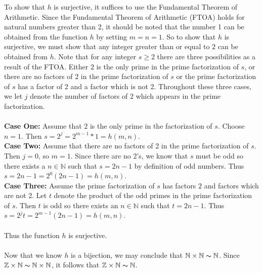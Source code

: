 \documentclass[12pt]{article}
\begin{document}
\noindent To show that $h$ is surjective, it suffices to use the Fundamental Theorem of Arithmetic. Since the Fundamental Theorem of Arithmetic (FTOA) holds for natural numbers greater than 2, it should be noted that the number 1 can be obtained from the function $h$ by setting $m=n=1$. So to show that $h$ is surjective, we must show that any integer greater than or equal to $2$ can be obtained from $h$. Note that for any integer $s \geq 2$ there are three possibilities as a result of the FTOA. Either $2$ is the only prime in the prime factorization of $s$, or there are no factors of $2$ in the prime factorization of $s$ or the prime factorization of $s$ has a factor of 2 and a factor which is not 2. Throughout these three cases, we let $j$ denote the number of factors of $2$ which appears in the prime factorization. \\ \\
\textbf{Case One:} Assume that $2$ is the only prime in the factorization of $s$. Choose $n=1$. Then $s=2^{j}=2^{m-1}*1=h(m,n)$. \\
\textbf{Case Two:} Assume that there are no factors of 2 in the prime factorization of $s$. Then $j=0$, so $m=1$. Since there are no 2's, we know that $s$ must be odd so there exists a $n \in \mathbb{N}$ such that $s=2n-1$ by definition of odd numbers. Thus $s=2n-1=2^{0}(2n-1)=h(m,n)$. \\
\textbf{Case Three:} Assume the prime factorization of $s$ has  factors $2$ and factors which are not 2. Let $t$ denote the product of the odd primes in the prime factorization of $s$. Then $t$ is odd so there exists an $n \in \mathbb{N}$ such that $t=2n-1$. Thus $s=2^{j}t=2^{m-1}(2n-1)=h(m,n)$. \\ \\
Thus the function $h$ is surjective. \\ \\

\noindent Now that we know $h$ is a bijection, we may conclude that $\mathbb{N} \times \mathbb{N} \thicksim \mathbb{N}$. Since $\mathbb{Z} \times \mathbb{N} \thicksim \mathbb{N} \times \mathbb{N}$, it follows that  $\mathbb{Z} \times \mathbb{N} \thicksim \mathbb{N}$. \\ \\
\end{document}
